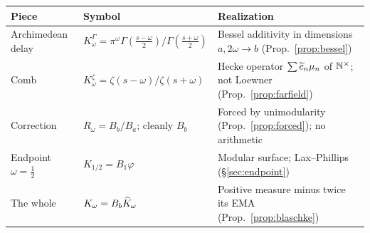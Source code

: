 \begin{center}
\small
\begin{tabular}{@{}lll@{}}
\toprule
Piece & Symbol & Realization \\
\midrule
Archimedean delay & $K^\Gamma_\omega=\pi^\omega\Gamma(\frac{s-\omega}2)/\Gamma(\frac{s+\omega}2)$ & Bessel additivity in dimensions $a,2\omega\to b$ (Prop.~\ref{prop:bessel}) \\
Comb & $K^\zeta_\omega=\zeta(s-\omega)/\zeta(s+\omega)$ & Hecke operator $\sum\widetilde c_n\mu_n$ of $\mathbb N^\times$; not Loewner (Prop.~\ref{prop:farfield}) \\
Correction & $R_\omega=B_b/B_a$; cleanly $B_b$ & Forced by unimodularity (Prop.~\ref{prop:forced}); no arithmetic \\
Endpoint $\omega=\frac12$ & $K_{1/2}=B_1\varphi$ & Modular surface; Lax--Phillips (\S\ref{sec:endpoint}) \\
The whole & $K_\omega=B_b\widehat K_\omega$ & Positive measure minus twice its EMA (Prop.~\ref{prop:blaschke}) \\
\bottomrule
\end{tabular}
\end{center}

